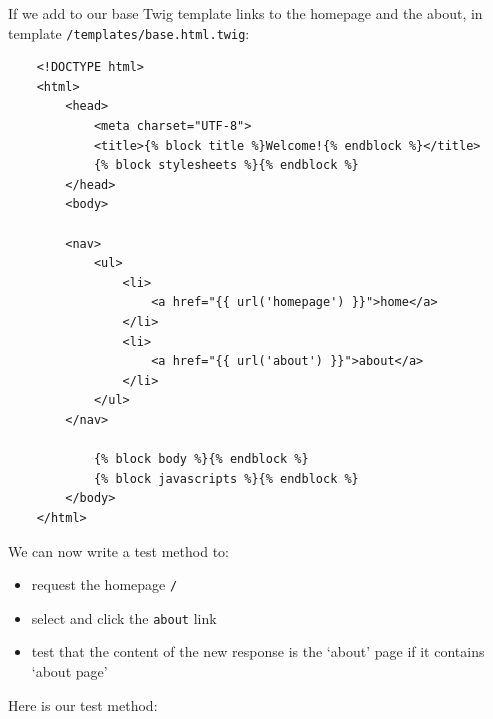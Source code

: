 \documentclass[a4paperpaper,openright]{book}
\begin{document}
If we add to our base Twig template links to the homepage and the about,
in template \texttt{/templates/base.html.twig}:

\begin{verbatim}
    <!DOCTYPE html>
    <html>
        <head>
            <meta charset="UTF-8">
            <title>{% block title %}Welcome!{% endblock %}</title>
            {% block stylesheets %}{% endblock %}
        </head>
        <body>

        <nav>
            <ul>
                <li>
                    <a href="{{ url('homepage') }}">home</a>
                </li>
                <li>
                    <a href="{{ url('about') }}">about</a>
                </li>
            </ul>
        </nav>

            {% block body %}{% endblock %}
            {% block javascripts %}{% endblock %}
        </body>
    </html>
\end{verbatim}

We can now write a test method to:

\begin{itemize}
\item
  request the homepage \texttt{/}
\item
  select and click the \texttt{about} link
\item
  test that the content of the new response is the `about' page if it
  contains `about page'
\end{itemize}

Here is our test method:
\end{document}
